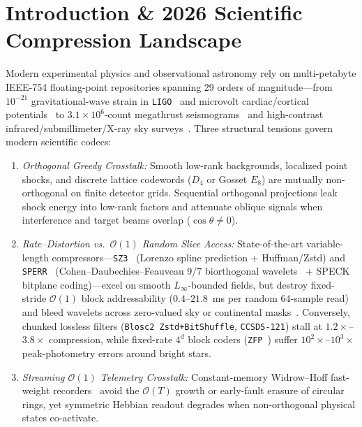 \documentclass[10pt,twocolumn]{article}
\begin{document}
\section{Introduction \& 2026 Scientific Compression Landscape}
Modern experimental physics and observational astronomy rely on multi-petabyte IEEE-754 floating-point repositories spanning 29 orders of magnitude---from $10^{-21}$ gravitational-wave strain in \texttt{LIGO}~\citep{abbott2016observation} and microvolt cardiac/cortical potentials~\citep{goldberger2000physionet,moody2001impact,schalk2004bci2000,hjorth1975onlinesource} to $3.1\times 10^6$-count megathrust seismograms~\citep{asl1988gsn} and high-contrast infrared/submillimeter/X-ray sky surveys~\citep{fazio2004irac,ginsburg2013bolocam,ridge2006complete,snowden1997rosat}. Three structural tensions govern modern scientific codecs:
\begin{enumerate}
    \item \emph{Orthogonal Greedy Crosstalk:} Smooth low-rank backgrounds, localized point shocks, and discrete lattice codewords ($D_4$ or Gosset $E_8$) are mutually non-orthogonal on finite detector grids. Sequential orthogonal projections leak shock energy into low-rank factors and attenuate oblique signals when interference and target beams overlap ($\cos\theta \neq 0$).
    \item \emph{Rate--Distortion vs.\ $\mathcal{O}(1)$ Random Slice Access:} State-of-the-art variable-length compressors---\texttt{SZ3}~\citep{liang2022sz3} (Lorenzo spline prediction + Huffman/Zstd) and \texttt{SPERR}~\citep{li2023sperr} (Cohen--Daubechies--Feauveau $9/7$ biorthogonal wavelets~\citep{cohen1992biorthogonal} + SPECK bitplane coding)---excel on smooth $L_\infty$-bounded fields, but destroy fixed-stride $\mathcal{O}(1)$ block addressability ($0.4\text{--}21.8$~ms per random $64$-sample read) and bleed wavelets across zero-valued sky or continental masks~\citep{reynolds2002improved}. Conversely, chunked lossless filters (\texttt{Blosc2 Zstd+BitShuffle}, \texttt{CCSDS-121}) stall at $1.2\times$--$3.8\times$ compression, while fixed-rate $4^d$ block coders (\texttt{ZFP}~\citep{lindstrom2014zfp}) suffer $10^2\times$--$10^3\times$ peak-photometry errors around bright stars.
    \item \emph{Streaming $\mathcal{O}(1)$ Telemetry Crosstalk:} Constant-memory Widrow--Hoff fast-weight recorders~\citep{widrow1960adaptive} avoid the $\mathcal{O}(T)$ growth or early-fault erasure of circular rings, yet symmetric Hebbian readout degrades when non-orthogonal physical states co-activate.
\end{enumerate}
\end{document}
